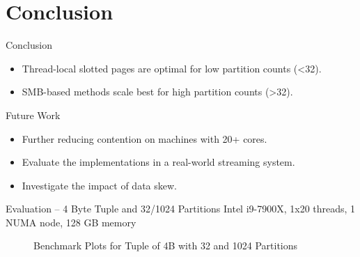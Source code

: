 \section{Conclusion}
\begin{frame}{Conclusion}
  \begin{itemize}
    \item Thread-local slotted pages are optimal for low partition counts (<32).
    \item SMB-based methods scale best for high partition counts (>32).
  \end{itemize}

  {\PraesentationSchriftgroesseSehrGross\selectfont Future Work}
  \begin{itemize}
    \item Further reducing contention on machines with 20+ cores.
    \item Evaluate the implementations in a real-world streaming system.
    \item Investigate the impact of data skew.
  \end{itemize}

\end{frame}

\appendix

\begin{frame}{Evaluation -- \LARGE 4 Byte Tuple and 32/1024 Partitions}
  Intel i9-7900X, 1x20 threads, 1 NUMA node, 128 GB memory
  \begin{figure}[h]
    \centering
    \begin{subfigure}{.49\textwidth}
      \centering
      \resizebox{\linewidth}{!}{}
    \end{subfigure}
    \begin{subfigure}{.49\textwidth}
      \centering
      \resizebox{\linewidth}{!}{}
    \end{subfigure}
    \begin{subfigure}{\textwidth}
      \centering
      \resizebox{.85\linewidth}{!}{}
    \end{subfigure}
    \caption[Shuffle Benchmark Plots for Tuple of 4B with 32 and 1024 Partitions]{Benchmark Plots for Tuple of 4B with 32 and 1024 Partitions}
    \label{plot-shuffle-4B-32-1024}
  \end{figure}
\end{frame}


